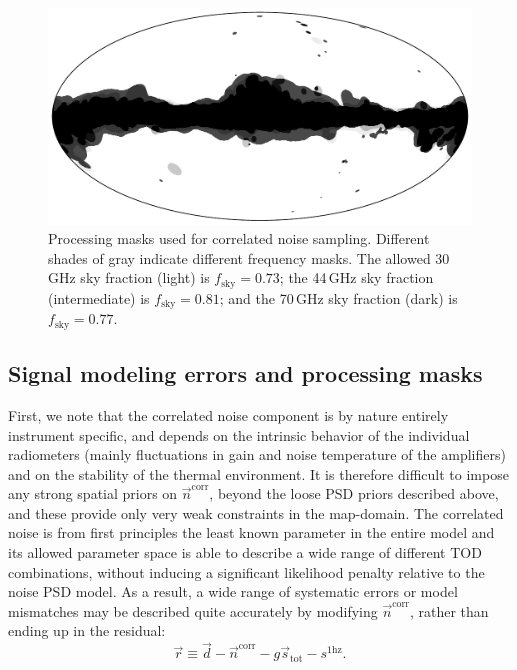 \documentclass{aa}
\newcommand{\n}[0]{\vec{n}}
\renewcommand{\r}[0]{\vec{r}}
\begin{document}
\begin{figure}
        \begin{center}
                \includegraphics[width=\linewidth]{figs/mask_proc_BP8_v1.pdf}    
        \end{center}
        \caption{Processing masks used for correlated noise
                sampling. Different shades of gray indicate different frequency
                masks. The allowed 30\,GHz sky fraction (light)
                is $f_{\mathrm{sky}}=0.73$; the 44\,GHz sky fraction
                (intermediate) is $f_{\mathrm{sky}}=0.81$; and the 70\,GHz sky fraction
                (dark) is $f_{\mathrm{sky}}=0.77$.
                \label{fig:procmask}}
\end{figure}

\subsection{Signal modeling errors and processing masks}

First, we note that the correlated noise component is by nature
entirely instrument specific, and depends on the intrinsic 
behavior of the individual radiometers (mainly fluctuations in 
gain and noise temperature of the amplifiers) and on the stability 
of the thermal environment. It is therefore difficult to impose any
strong spatial priors on $\n^{\mathrm{corr}}$, beyond the loose PSD
priors described above, and these provide only very weak
constraints in the map-domain. The correlated noise is from first
principles the least known parameter in the
entire model and its allowed parameter space is able to describe a
wide range of different TOD combinations, without inducing a
significant likelihood penalty relative to the noise PSD model. As a
result, a wide range of systematic errors or model mismatches may be
described quite accurately by modifying $\vec{n}^\mathrm{corr}$,
rather than ending up in the residual:
\begin{equation}
  \r \equiv \vec{d} - \vec{n}^\mathrm{corr}
  - g\vec{s}_\mathrm{tot} - s^{\mathrm{1hz}}.
  \label{eq:residual}
\end{equation}
\end{document}
